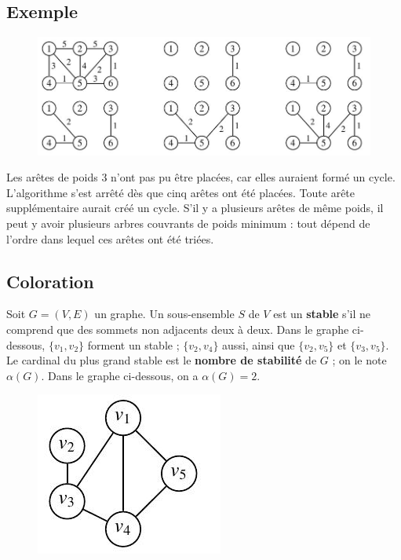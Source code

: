 \subsection*{Exemple}

\begin{figure}[h]
\centering
\includegraphics[width=\linewidth]{images/graph17}
\end{figure}

Les arêtes de poids 3 n'ont pas pu être placées, car elles auraient formé un cycle.
L'algorithme s'est arrêté dès que cinq arêtes ont été placées. Toute arête supplémentaire
aurait créé un cycle.
S'il y a plusieurs arêtes de même poids, il peut y avoir plusieurs arbres couvrants de poids
minimum : tout dépend de l'ordre dans lequel ces arêtes ont été triées.

\subsection{Coloration}
Soit $ G = (V, E) $ un graphe. Un sous-ensemble $ S $ de $ V $ est un \textbf{stable} s'il ne comprend que
des sommets non adjacents deux à deux. Dans le graphe ci-dessous, $ \{v_{1} , v_{2} \} $ forment un
stable ; $ \{v_{2} , v_{4} \} $ aussi, ainsi que $ \{v_{2} , v_{5} \} $ et $ \{v_{3} , v_{5}\} $.
Le cardinal du plus grand stable est le \textbf{nombre de stabilité} de $ G $ ; on le note $ \alpha (G) $. Dans
le graphe ci-dessous, on a $ \alpha (G)=2 $.

\begin{figure}[h]
\centering
\includegraphics[width=0.3\linewidth]{images/graph18}
\end{figure}
